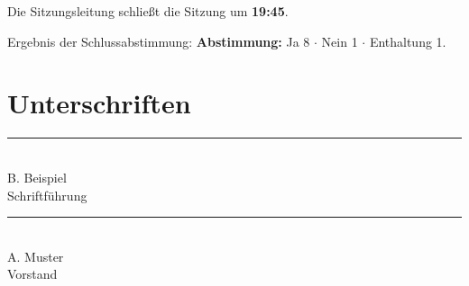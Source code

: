 \documentclass{scrbook}\PassOptionsToPackage{hyperfootnotes=false}{hyperref}\usepackage{amsmath}\usepackage{array}\usepackage[ngerman]{babel}\usepackage{biblatex}\usepackage{booktabs}\usepackage{calc}\usepackage{hyperref}\usepackage{cleveref}\usepackage{csquotes}\usepackage{etoolbox}\usepackage{eurosym}\usepackage{fontawesome}\usepackage{fontspec}\usepackage{geometry}\usepackage[acronym]{glossaries}\usepackage{graphicx}\usepackage{listings}\usepackage{lmodern}\usepackage{longtable}\usepackage[framemethod=tikz]{mdframed}\usepackage{multicol}\usepackage{needspace}\usepackage{pgf}\usepackage{pgffor}\usepackage{ragged2e}\usepackage{scrlayer-scrpage}\usepackage{setspace}\usepackage{tabularx}\usepackage{tikz}\usepackage{xcolor}\KOMAoptions{open=any,twoside=false}\geometry{a4paper=,top=2cm,bottom=2cm,left=2cm,right=2cm}\definecolor{britishracinggreen}{rgb}{0.0,0.26,0.15}\definecolor{eggplant}{rgb}{0.38,0.25,0.32}\definecolor{hanblue}{rgb}{0.27,0.42,0.81}\definecolor{navyblue}{rgb}{0.0,0.0,0.5}\definecolor{pansypurple}{rgb}{0.47,0.09,0.29}\definecolor{shockingpink}{rgb}{0.99,0.06,0.75}\definecolor{lightgray}{rgb}{0.8,0.8,0.8}\definecolor{hsrtcite}{rgb}{0.286,0.427,0.537}\definecolor{hsrtlink}{rgb}{0.161,0.31,0.427}\definecolor{hsrturl}{rgb}{0.071,0.212,0.322}\hypersetup{pdfpagemode=UseOutlines,bookmarksopen=true,bookmarksopenlevel=0,plainpages=false,hypertexnames=true,colorlinks=true,citecolor=hsrtcite,linkcolor=hsrtlink,urlcolor=hsrturl,pdfstartview=FitV,unicode=true,breaklinks=true}\crefname{figure}{Abbildung}{Abbildungen}\Crefname{figure}{Abbildung}{Abbildungen}\crefname{table}{Tabelle}{Tabellen}\Crefname{table}{Tabelle}{Tabellen}\crefname{equation}{Gleichung}{Gleichungen}\Crefname{equation}{Gleichung}{Gleichungen}\crefname{chapter}{Kapitel}{Kapitel}\Crefname{chapter}{Kapitel}{Kapitel}\crefname{section}{Abschnitt}{Abschnitte}\Crefname{section}{Abschnitt}{Abschnitte}\crefname{subsection}{Unterabschnitt}{Unterabschnitte}\Crefname{subsection}{Unterabschnitt}{Unterabschnitte}\crefname{subsubsection}{Unterunterabschnitt}{Unterunterabschnitte}\Crefname{subsubsection}{Unterunterabschnitt}{Unterunterabschnitte}\crefname{listing}{Listing}{Codeblock}\Crefname{listing}{Listing}{Codeblock}\crefname{appendix}{Anhang}{Anhänge}\Crefname{appendix}{Anhang}{Anhänge}\crefname{algorithm}{Algorithmus}{Algorithmen}\Crefname{algorithm}{Algorithmus}{Algorithmen}\crefname{theorem}{Theorem}{Theoreme}\Crefname{theorem}{Theorem}{Theoreme}\crefname{lemma}{Lemma}{Lemmata}\Crefname{lemma}{Lemma}{Lemmata}\crefname{corollary}{Korollar}{Korollare}\Crefname{corollary}{Korollar}{Korollare}\crefname{proposition}{Proposition}{Propositionen}\Crefname{proposition}{Proposition}{Propositionen}\crefname{definition}{Definition}{Definitionen}\Crefname{definition}{Definition}{Definitionen}\crefname{example}{Beispiel}{Beispiele}\Crefname{example}{Beispiel}{Beispiele}\crefname{remark}{Bemerkung}{Bemerkungen}\Crefname{remark}{Bemerkung}{Bemerkungen}\crefname{footnote}{Fußnote}{Fußnoten}\Crefname{footnote}{Fußnote}{Fußnoten}\crefname{enumi}{Punkt}{Punkte}\Crefname{enumi}{Punkt}{Punkte}\crefname{enumii}{Punkt}{Punkte}\Crefname{enumii}{Punkt}{Punkte}\crefname{enumiii}{Punkt}{Punkte}\Crefname{enumiii}{Punkt}{Punkte}\crefname{enumiv}{Punkt}{Punkte}\Crefname{enumiv}{Punkt}{Punkte}\crefname{page}{Seite}{Seiten}\Crefname{page}{Seite}{Seiten}\crefname{line}{Zeile}{Zeilen}\Crefname{line}{Zeile}{Zeilen}\lstset{basicstyle=\footnotesize\ttfamily,breaklines=true,numbers=left,frame=single,float=H}\lstdefinestyle{htmlCode}{language=html,basicstyle=\scriptsize\ttfamily,keywordstyle=\color{blue}\bfseries\ttfamily,commentstyle=\color{gray}\ttfamily,escapechar=|}\lstdefinestyle{phpCode}{language=php,morekeywords={php},basicstyle=\footnotesize\ttfamily,keywordstyle=\color{blue}\bfseries\ttfamily,commentstyle=\color{gray}\ttfamily,escapechar=|}\lstdefinestyle{jsCode}{language=javascript,basicstyle=\scriptsize\ttfamily,keywordstyle=\color{blue}\bfseries\ttfamily,commentstyle=\color{gray}\ttfamily,escapechar=|}\lstdefinestyle{shellCodeNOPASSWD}{language=sh,deletekeywords={for,kill,cat},morekeywords={sudo},basicstyle=\scriptsize\ttfamily,keywordstyle=\color{blue}\bfseries\ttfamily,commentstyle=\color{gray}\ttfamily,escapechar=|,numbers=none}\lstdefinestyle{shellCode}{language=sh,morekeywords={sudo,chmod,chown,cp,su,rm,python},basicstyle=\scriptsize\ttfamily,keywordstyle=\color{blue}\bfseries\ttfamily,commentstyle=\color{gray}\ttfamily,escapechar=|}\lstdefinestyle{URL}{basicstyle=\footnotesize\ttfamily,commentstyle=\color{gray}\ttfamily,escapechar=|,numbers=none}\newcommand{\acr}{\acrshort}\usepackage{lastpage}
\begin{document}
Die Sitzungsleitung schließt die Sitzung um \textcolor{hanblue}{ \textbf{19:45}}.

Ergebnis der Schlussabstimmung: \textbf{Abstimmung: }\textcolor{britishracinggreen}{Ja 8 $\cdot$ Nein 1 $\cdot$ Enthaltung 1}.

\par\vspace{2em}\section*{Unterschriften}\par\vspace{3em}\noindent \begin{minipage}[t]{0.46\linewidth}\centering\rule{5cm}{0.4pt}\\[0.4em]B. Beispiel\\{\small Schriftführung}\end{minipage}\hfill\begin{minipage}[t]{0.46\linewidth}\centering\rule{5cm}{0.4pt}\\[0.4em]A. Muster\\{\small Vorstand}\end{minipage}
\end{document}

